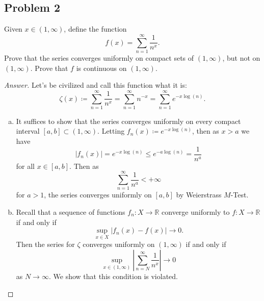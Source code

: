 \documentclass[12pt]{article}
\newcommand{\real}{\mathbb{R}}
\newcommand{\abs}[1]{\left | #1 \right |}
\theoremstyle{definition}
\begin{document}
\subsection{Problem 2 \texorpdfstring{\cite{Christian}}{}}
Given $x \in (1,\infty)$, define the function 
\[
    f(x) = \sum\limits_{n = 1}^{\infty} \frac{1}{n^x} .
\]
Prove that the series converges uniformly on compact sets of $(1,\infty)$, but not on $(1,\infty)$. Prove that $f$ is continuous on $(1,\infty)$. 
\begin{proof}[Answer]
    Let's be civilized and call this function what it is: 
    \[
        \zeta(x) \coloneqq \sum\limits_{n = 1}^{\infty} \frac{1}{n^x} = \sum\limits_{n = 1}^{\infty} n^{-x} = \sum\limits_{n = 1}^{\infty} e^{-x \log(n)} . 
    \]
    \begin{enumerate}[(a)]
        \item It suffices to show that the series converges uniformly on every compact interval $[a,b] \subset (1,\infty)$. Letting $f_n(x) \coloneqq e^{-x \log(n)}$, then as $x > a$ we have 
        \[
            \abs{ f_n(x) } = e^{-x \log(n)} \leq e^{-a \log(n)} = \frac{1}{n^a} 
        \]
        for all $x \in [a,b]$. Then as 
        \[
            \sum\limits_{n = 1}^{\infty} \frac{1}{n^a} < +\infty 
        \]
        for $a > 1$, the series converges uniformly on $[a,b]$ by Weierstrass $M$-Test. 
        \item Recall that a sequence of functions $f_n : X \to \real$ converge uniformly to $f : X \to \real$ if and only if 
        \[
            \sup\limits_{x \in X} \abs{ f_n(x) - f(x) } \to 0 . 
        \]
        Then the series for $\zeta$ converges uniformly on $(1,\infty)$ if and only if 
        \[
            \sup\limits_{x \in (1,\infty)} \abs{ \sum\limits_{n = N}^{\infty} \frac{1}{n^x} } \to 0
        \]
        as $N \to \infty$. We show that this condition is violated. 
        

\end{enumerate}
\end{proof}
\end{document}

